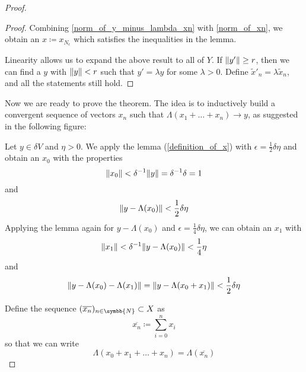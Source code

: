 \documentclass[a4paper, 12pt]{article}
\theoremstyle{definition}
\newcommand{\naturals}{\symbb{N}}
\DeclarePairedDelimiter{\norm}{\lVert}{\rVert}
\begin{document}
\begin{proof}
\begin{proof}
Combining \ref{norm_of_y_minus_lambda_xn} with \ref{norm_of_xn}, we obtain an \(x \coloneqq x_{N_\epsilon}\) which satisfies the inequalities in the lemma.

Linearity allows us to expand the above result to all of \(Y\). If \(\norm{y'} \geq r\), then we can find a \(y\) with \(\norm{y} < r\) such that \(y' = \lambda y\) for some \(\lambda > 0\). Define \(\widetilde{x}'_n = \lambda \widetilde{x}_n\), and all the statements still hold.
\end{proof}

Now we are ready to prove the theorem. The idea is to inductively build a convergent sequence of vectors \(x_n\) such that \(\Lambda(x_1 + \dots + x_n) \to y\), as suggested in the following figure:
\begin{figure}[H]
    \centering
\end{figure}

Let \(y \in \delta V\) and \(\eta > 0\). We apply the lemma (\ref{definition_of_x}) with \(\epsilon = \frac{1}{2} \delta \eta\) and obtain an \(x_0\) with the properties
\[
    \norm{x_0} < \delta^{-1} \norm{y} = \delta^{-1} \delta = 1
\]
and
\[
    \norm{y - \Lambda(x_0)} < \frac{1}{2} \delta \eta
\]
Applying the lemma again for \(y - \Lambda(x_0)\) and \(\epsilon = \frac{1}{4} \delta \eta\), we can obtain an \(x_1\) with
\[
    \norm{x_1} < \delta^{-1} \norm{y - \Lambda(x_0)} < \frac{1}{4} \eta
\]
and
\[
    \norm{y - \Lambda(x_0) - \Lambda(x_1)} = \norm{y - \Lambda(x_0 + x_1)} < \frac{1}{2} \delta \eta
\]

Define the sequence \((\overline{x_n})_{n \in \naturals} \subset X\) as
\[
    \overline{x_n} \coloneqq \sum_{i = 0}^{n} x_i
\]
so that we can write
\[
    \Lambda(x_0 + x_1 + \dots + x_n) = \Lambda(\overline{x_n})
\]


\end{proof}
\end{document}
